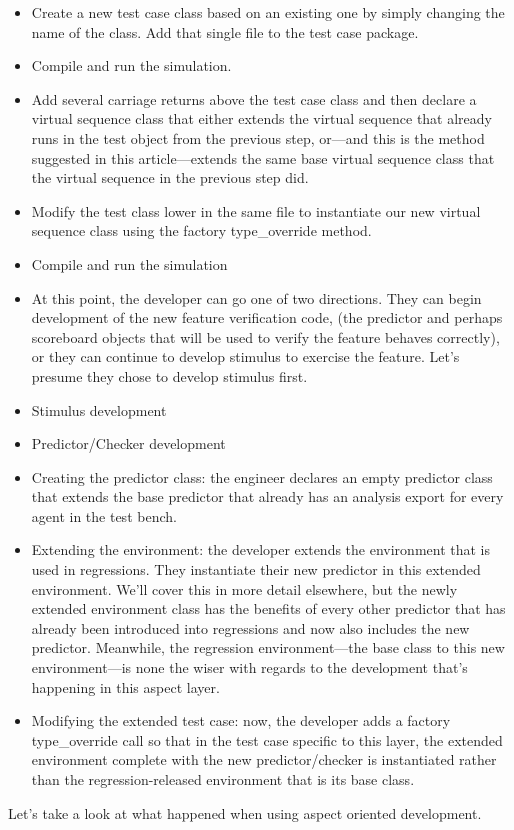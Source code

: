 \documentclass[twocolumn,letterpaper]{IEEEAerospaceCLS}  %
\begin{document}
\begin{itemize}
    \item Create a new test case class based on an existing one by simply changing the name of the class.
Add that single file to the test case package.
    \item Compile and run the simulation.
    \item Add several carriage returns above the test case class and then declare a virtual sequence class that either extends the virtual sequence that already runs in the test object from the previous step, or—and this is the method suggested in this article—extends the same base virtual sequence class that the virtual sequence in the previous step did.
    \item Modify the test class lower in the same file to instantiate our new virtual sequence class using the factory type\_override method.
    \item Compile and run the simulation
    \item At this point, the developer can go one of two directions. They can begin development of the new feature verification code, (the predictor and perhaps scoreboard objects that will be used to verify the feature behaves correctly), or they can continue to develop stimulus to exercise the feature. Let's presume they chose to develop stimulus first.
    \item Stimulus development
    \item Predictor/Checker development
    \item Creating the predictor class: the engineer declares an empty predictor class that extends the base predictor that already has an analysis export for every agent in the test bench.
    \item Extending the environment: the developer extends the environment that is used in regressions. They instantiate their new predictor in this extended environment. We'll cover this in more detail elsewhere, but the newly extended environment class has the benefits of every other predictor that has already been introduced into regressions and now also includes the new predictor. Meanwhile, the regression environment—the base class to this new environment—is none the wiser with regards to the development that's happening in this aspect layer.
    \item Modifying the extended test case: now, the developer adds a factory type\_override call so that in the test case specific to this layer, the extended environment complete with the new predictor/checker is instantiated rather than the regression-released environment that is its base class.
\end{itemize}
Let's take a look at what happened when using aspect oriented development.
\end{document}
